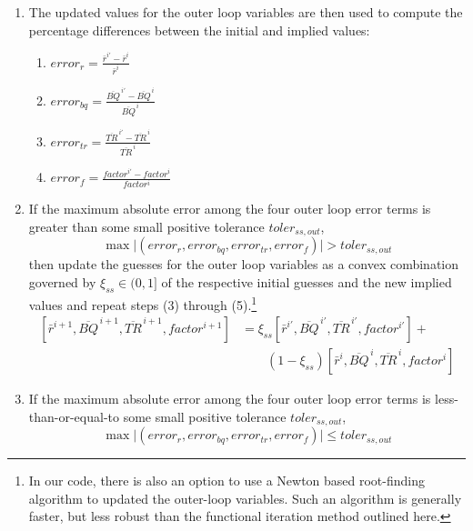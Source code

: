 \begin{enumerate}
\begin{enumerate}
      \end{enumerate}
  \item The updated values for the outer loop variables are then used to compute the percentage differences between the initial and implied values:
  	\begin{enumerate}
  		\item $error_r = \frac{\bar{r}^{i'} - \bar{r}^i}{\bar{r}^i}$
  		\item $error_{bq} = \frac{\overline{BQ}^{\,i'} - \overline{BQ}^{\,i}}{\overline{BQ}^{\,i}}$
  		\item $error_{tr} = \frac{\overline{TR}^{\,i'} - \overline{TR}^{\,i}}{\overline{TR}^{\,i}}$
  		\item $error_f = \frac{factor^{i'} - factor^i}{factor^i}$
  	\end{enumerate}
   \item If the maximum absolute error among the four outer loop error terms is greater than some small positive tolerance $toler_{ss,out}$,
    \begin{equation*}
      \max\big|\left(error_r,error_{bq},error_{tr},error_f\right)\bigr| > toler_{ss,out}
    \end{equation*}
    then update the guesses for the outer loop variables as a convex combination governed by $\xi_{ss}\in(0,1]$ of the respective initial guesses and the new implied values and repeat steps (3) through (5).\footnote{In our code, there is also an option to use a Newton based root-finding algorithm to updated the outer-loop variables.  Such an algorithm is generally faster, but less robust than the functional iteration method outlined here.}
    \begin{equation*}
      \begin{split}
        \left[\bar{r}^{i+1},\overline{BQ}^{\,i+1},\overline{TR}^{\,i+1},factor^{i+1}\right] &= \xi_{ss}\left[\bar{r}^{i'},\overline{BQ}^{\,i'},\overline{TR}^{\,i'},factor^{i'}\right] + \\
        &\qquad(1-\xi_{ss})\left[\bar{r}^{i},\overline{BQ}^{\,i},\overline{TR}^{\,i},factor^{i}\right]
      \end{split}
    \end{equation*}
    \item If the maximum absolute error among the four outer loop error terms is less-than-or-equal-to some small positive tolerance $toler_{ss,out}$,
    \begin{equation*}
      \max\big|\left(error_r,error_{bq},error_{tr},error_f\right)\bigr| \leq toler_{ss,out}

\end{equation*}
\end{enumerate}
